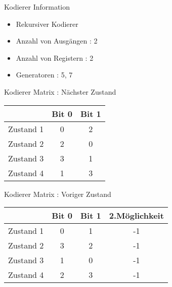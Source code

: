 \begin{frame}{Kodierer Information}

\begin{itemize}
\tightlist
\item
  Rekursiver Kodierer
\item
  Anzahl von Ausgängen : 2
\item
  Anzahl von Registern : 2
\item
  Generatoren : 5, 7
\end{itemize}

\end{frame}

\begin{frame}{Kodierer Matrix : Nächster Zustand}

\begin{longtable}[c]{@{}lcc@{}}
\toprule
& Bit 0 & Bit 1\tabularnewline
\midrule
\endhead
Zustand 1 & 0 & 2\tabularnewline
Zustand 2 & 2 & 0\tabularnewline
Zustand 3 & 3 & 1\tabularnewline
Zustand 4 & 1 & 3\tabularnewline
\bottomrule
\end{longtable}

\end{frame}

\begin{frame}{Kodierer Matrix : Voriger Zustand}

\begin{longtable}[c]{@{}lccc@{}}
\toprule
& Bit 0 & Bit 1 & 2.Möglichkeit\tabularnewline
\midrule
\endhead
Zustand 1 & 0 & 1 & -1\tabularnewline
Zustand 2 & 3 & 2 & -1\tabularnewline
Zustand 3 & 1 & 0 & -1\tabularnewline
Zustand 4 & 2 & 3 & -1\tabularnewline
\bottomrule
\end{longtable}

\end{frame}

